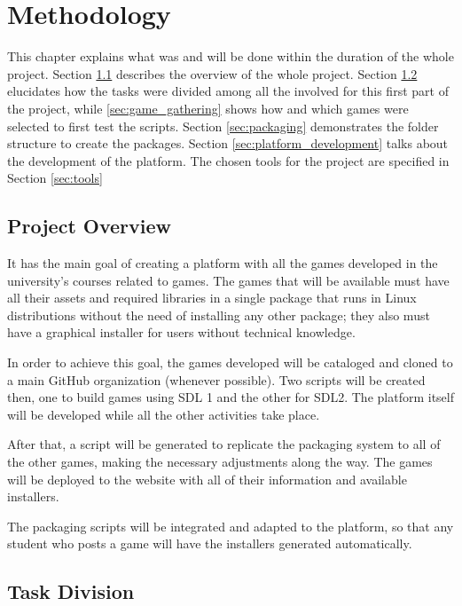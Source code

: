 \chapter{Methodology}
\label{sec:methodology}

This chapter explains what was and will be done within the duration of the whole project. Section \ref{sec:project_overview} describes the overview of the whole project. Section \ref{sec:task_division} elucidates how the tasks were divided among all the involved for this first part of the project, while  \ref{sec:game_gathering} shows how and which games were selected to first test the scripts. Section \ref{sec:packaging} demonstrates the folder structure to create the packages. Section \ref{sec:platform_development} talks about the development of the platform. The chosen tools for the project are specified in Section \ref{sec:tools}

\section{Project Overview}
\label{sec:project_overview}

It has the main goal of creating a platform with all the games developed in the university's courses related to games. The games that will be available must have all their assets and required libraries in a single package that runs in Linux distributions without the need of installing any other package; they also must have a graphical installer for users without technical knowledge.

In order to achieve this goal, the games developed will be cataloged and cloned to a main GitHub organization (whenever possible). Two scripts will be created then, one to build games using SDL 1 and the other for SDL2. The platform itself will be developed while all the other activities take place.

After that, a script will be generated to replicate the packaging system to all of the other games, making the necessary adjustments along the way. The games will be deployed to the website with all of their information and available installers.

The packaging scripts will be integrated and adapted to the platform, so that any student who posts a game will have the installers generated automatically.

\section{Task Division}
\label{sec:task_division}

